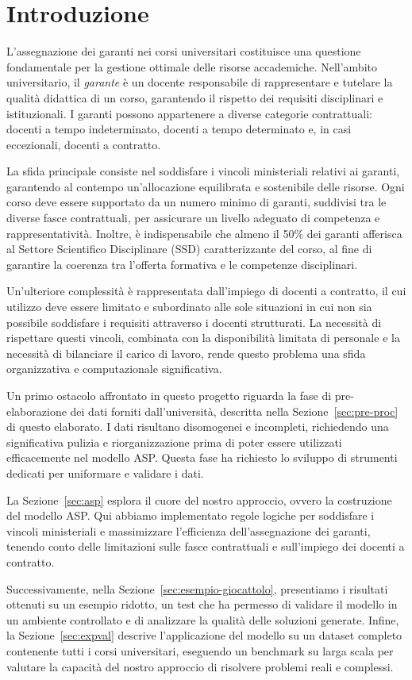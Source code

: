 \section{Introduzione}
\label{sec:introduction}

L'assegnazione dei garanti nei corsi universitari costituisce una 
questione fondamentale per la gestione ottimale delle risorse accademiche. 
Nell'ambito universitario, il \textit{garante} è un docente responsabile 
di rappresentare e tutelare la qualità didattica di un corso, garantendo 
il rispetto dei requisiti disciplinari e istituzionali. I garanti possono 
appartenere a diverse categorie contrattuali: docenti a tempo indeterminato, 
docenti a tempo determinato e, in casi eccezionali, docenti a contratto.

La sfida principale consiste nel soddisfare i vincoli ministeriali 
relativi ai garanti, garantendo al contempo un'allocazione equilibrata 
e sostenibile delle risorse. Ogni corso deve essere supportato da un 
numero minimo di garanti, suddivisi tra le diverse fasce contrattuali, 
per assicurare un livello adeguato di competenza e rappresentatività. 
Inoltre, è indispensabile che almeno il 50\% dei garanti afferisca al 
Settore Scientifico Disciplinare (SSD) caratterizzante del corso, al 
fine di garantire la coerenza tra l'offerta formativa e le competenze 
disciplinari.

Un'ulteriore complessità è rappresentata dall'impiego di docenti a 
contratto, il cui utilizzo deve essere limitato e subordinato alle 
sole situazioni in cui non sia possibile soddisfare i requisiti 
attraverso i docenti strutturati. La necessità di rispettare questi 
vincoli, combinata con la disponibilità limitata di personale e la 
necessità di bilanciare il carico di lavoro, rende questo problema 
una sfida organizzativa e computazionale significativa.

Un primo ostacolo affrontato in questo progetto riguarda la fase di 
pre-elaborazione dei dati forniti dall'università, descritta nella 
Sezione~\ref{sec:pre-proc} di questo elaborato. I dati risultano 
disomogenei e incompleti, richiedendo una significativa pulizia e 
riorganizzazione prima di poter essere utilizzati efficacemente nel 
modello ASP. Questa fase ha richiesto lo sviluppo di strumenti 
dedicati per uniformare e validare i dati.

La Sezione~\ref{sec:asp} esplora il cuore del nostro approccio, 
ovvero la costruzione del modello ASP. Qui abbiamo implementato 
regole logiche per soddisfare i vincoli ministeriali e massimizzare 
l'efficienza dell'assegnazione dei garanti, tenendo conto delle 
limitazioni sulle fasce contrattuali e sull'impiego dei docenti a contratto.

Successivamente, nella Sezione~\ref{sec:esempio-giocattolo}, presentiamo 
i risultati ottenuti su un esempio ridotto, un test che ha permesso 
di validare il modello in un ambiente controllato e di analizzare la qualità 
delle soluzioni generate. Infine, la Sezione~\ref{sec:expval} descrive 
l'applicazione del modello su un dataset completo contenente tutti i corsi 
universitari, eseguendo un benchmark su larga scala per valutare la 
capacità del nostro approccio di risolvere problemi reali e complessi.